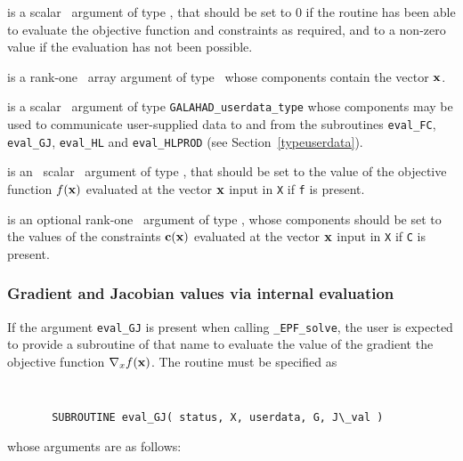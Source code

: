 \documentclass{galahad}
\newcommand{\packagename}{EPF}
\newcommand{\fullpackagename}{\libraryname\_\packagename}
\newcommand{\solver}{{\tt \fullpackagename\_solve}}
\begin{document}
\begin{description}
 is a scalar \intentout\ argument of type \integer,
that should be set to 0 if the routine has been able to evaluate
the objective function and constraints as required,
and to a non-zero value if the evaluation has not been possible.

 is a rank-one \intentin\ array argument of type \realdp\
whose components contain the vector ${\mathbf{x}}$.

 is a scalar \intentinout\ argument of type
{\tt GALAHAD\_userdata\_type} whose components may be used
to communicate user-supplied data to and from the
subroutines {\tt eval\_FC}, {\tt eval\_GJ},
{\tt eval\_HL} and {\tt eval\_HLPROD}
(see Section~\ref{typeuserdata}).

 is an \optional\ scalar \intentout\ argument of type \realdp,
that should be set to the value of the objective function $f({\mathbf{x}})$
evaluated at the vector ${\mathbf{x}}$ input in {\tt X} if {\tt f} is present.

 is an optional rank-one \intentout\ argument of type \realdp,
whose components should be set to the values of the constraints
${\mathbf{c}}({\mathbf{x}})$ evaluated at the vector ${\mathbf{x}}$ input in {\tt X} 
if {\tt C} is present.

\end{description}


\subsubsection{Gradient and Jacobian values via internal evaluation\label{gjfv}}

If the argument {\tt eval\_GJ} is present when calling \solver, the
user is expected to provide a subroutine of that name to evaluate the
value of the gradient the objective function $\nabla_x f({\mathbf{x}})$.
The routine must be specified as

\def\baselinestretch{0.8}
{\tt
\begin{verbatim}
       SUBROUTINE eval_GJ( status, X, userdata, G, J\_val )
\end{verbatim} }
\def\baselinestretch{1.0}
\noindent whose arguments are as follows:
\end{document}
